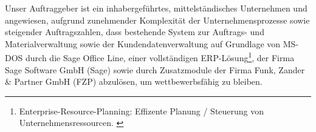 Unser Auftraggeber ist ein inhabergeführtes, mittelständisches Unternehmen und angewiesen, aufgrund zunehmender Komplexität der Unternehmensprozesse sowie steigender Auftragszahlen, dass bestehende System zur Auftrags- und Materialverwaltung sowie der Kundendatenverwaltung auf Grundlage von MS-DOS durch die Sage Office Line, einer vollständigen ERP-Lösung\footnote{\label{foot:1}Enterprise-Resource-Planning: Effizente Planung / Steuerung von Unternehmensressourcen. \cite{ERP}}, der Firma Sage Software GmbH (Sage) sowie durch Zusatzmodule der Firma Funk, Zander \& Partner GmbH (FZP) abzulösen, um wettbewerbsfähig zu bleiben. \cite{einleitung1}